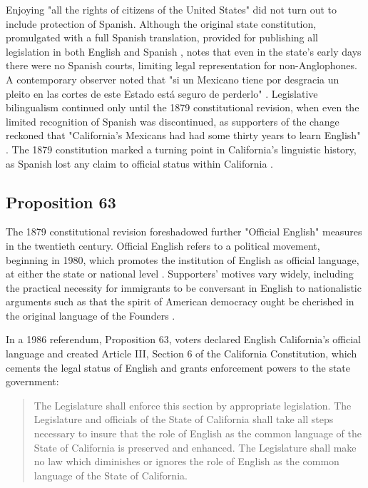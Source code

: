 Enjoying "all the rights of citizens of the United States" did not turn out to
include protection of Spanish. Although the original state constitution,
promulgated with a full Spanish translation, provided for publishing all
legislation in both English and Spanish \parencite{baron92},
\textcite{lamar-prieto14} notes that even in the state's early days there were
no Spanish courts, limiting legal representation for non-Anglophones. A
contemporary observer noted that "si un Mexicano tiene por desgracia un pleito
en las cortes de este Estado está seguro de perderlo"
\parencite[28]{lamar-prieto14}. Legislative bilingualism continued only until
the 1879 constitutional revision, when even the limited recognition of Spanish
was discontinued, as supporters of the change reckoned that "California's
Mexicans had had some thirty years to learn English" \parencite{baron92}. The
1879 constitution marked a turning point in California's linguistic history, as
Spanish lost any claim to official status within California
\parencite{baron92}.

\subsection{Proposition 63}

The 1879 constitutional revision foreshadowed further "Official English"
measures in the twentieth century. Official English refers to a political
movement, beginning in 1980, which promotes the institution of English as
official language, at either the state or national level \parencite{liu14}.
Supporters' motives vary widely, including the practical necessity for
immigrants to be conversant in English to nationalistic arguments such as that
the spirit of American democracy ought be cherished in the original language of
the Founders \parencite[7]{baron92}.

In a 1986 referendum, Proposition 63, voters declared English California's
official language and created Article III, Section 6 of the California
Constitution, which cements the legal status of English and grants enforcement
powers to the state government: 

\begin{quote}
	The Legislature shall enforce this section by appropriate legislation. The
	Legislature and officials of the State of California shall take all steps
	necessary to insure that the role of English as the common language of the
	State of California is preserved and enhanced. The Legislature shall make no
	law which diminishes or ignores the role of English as the common language of
	the State of California. \parencite{ca-const}
\end{quote}

